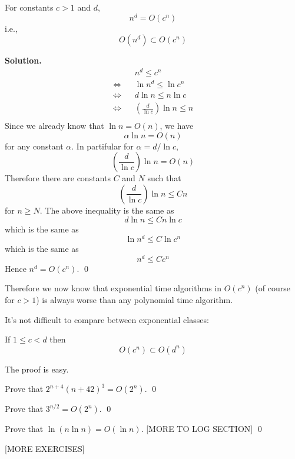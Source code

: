 \begin{thm} 
For constants $c > 1$ and $d$,
\[
n^d = O(c^n)
\]
i.e.,
\[
O(n^d) \subset O(c^n)
\]

\end{thm}

\textbf{Solution.}
\begin{align*}
& n^d \leq c^n \\
\iff \,\,\,\,\, & \ln n^d \leq \ln c^n \\
\iff \,\,\,\,\, & d \ln n \leq n \ln c \\
\iff \,\,\,\,\, & \left( \frac{d}{\ln c} \right) \ln n \leq n \\
\end{align*}
Since we already know that $\ln n = O(n)$, we have
\[
\alpha \ln n = O(n)
\]
for any constant $\alpha$.
In partifular for $\alpha = d/\ln c$,
\[
\left(
\frac{d}{\ln c}
\right)
\ln n = O(n)
\]
Therefore there are constants $C$ and $N$ such that
\[
\left(
\frac{d}{\ln c}
\right)
\ln n \leq Cn
\]
for $n \geq N$.
The above inequality is the same as
\[
d
\ln n \leq Cn \ln c
\]
which is the same as
\[
\ln n^d \leq C \ln c^n
\]
which is the same as 
\[
n^d \leq C c^n
\]
Hence $n^d = O(c^n)$.
\qed

Therefore we now know that exponential time algorithms in
$O(c^n)$ (of course for $c > 1$) is always worse than any
polynomial time algorithm.

It's not difficult to compare between 
exponential classes:

\begin{thm}
If $1 \leq c < d$ then
\[
O(c^n) \subset O(d^n)
\]
\end{thm}

The proof is easy.

\begin{ex}
Prove that $2^{n + 4} (n + 42)^3 = O(2^n)$.
\qed
\end{ex}

\begin{ex}
Prove that $3^{n/2} = O(2^n)$. 
\qed
\end{ex}

\begin{ex}
Prove that $\ln (n\ln n) = O(\ln n)$. 
[MORE TO LOG SECTION]
\qed
\end{ex}

[MORE EXERCISES]
